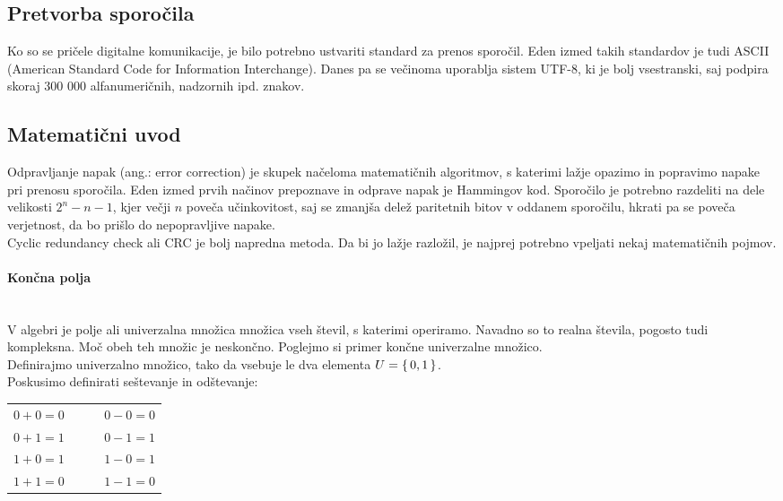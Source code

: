 \documentclass[12pt]{article}
\begin{document}
    \subsection{Pretvorba sporočila}
        Ko so se pričele digitalne komunikacije, je bilo potrebno ustvariti
        standard za prenos sporočil. Eden izmed takih standardov je tudi ASCII
        (American Standard Code for Information Interchange). Danes pa se
        večinoma uporablja sistem UTF-8, ki je bolj vsestranski, saj podpira
        skoraj 300 000 alfanumeričnih, nadzornih ipd. znakov.
    \subsection{Matematični uvod}
        Odpravljanje napak (ang.: error correction) je skupek načeloma
        matematičnih algoritmov, s katerimi lažje opazimo in popravimo napake
        pri prenosu sporočila.
        Eden izmed prvih načinov prepoznave in odprave napak je Hammingov kod.
        Sporočilo je potrebno razdeliti na dele velikosti $2^n - n - 1$,
        kjer večji $n$ poveča učinkovitost, saj se zmanjša delež paritetnih
        bitov v oddanem sporočilu, hkrati pa se poveča verjetnost, da bo prišlo
        do nepopravljive napake. \\

        Cyclic redundancy check ali CRC je bolj napredna metoda. Da bi jo lažje
        razložil, je najprej potrebno vpeljati nekaj matematičnih pojmov.
        \paragraph*{Končna polja} \label{sec:polja} \mbox{}\\
            V algebri je polje ali univerzalna množica množica vseh števil, s
            katerimi operiramo. Navadno so to realna števila, pogosto tudi
            kompleksna. Moč obeh teh množic je neskončno. Poglejmo si primer
            končne univerzalne množico. \\
            Definirajmo univerzalno množico, tako da vsebuje le dva elementa
            $U = \set{0, 1}$.\\
            Poskusimo definirati seštevanje in odštevanje:
            \begin{table}[h!]
                \centering
                \begin{tabular}{l p{0.2\linewidth}}
                    $0 + 0 = 0$  & $0 - 0 = 0$ \\
                    $0 + 1 = 1$  & $0 - 1 = 1$ \\
                    $1 + 0 = 1$  & $1 - 0 = 1$ \\
                    $1 + 1 = 0$  & $1 - 1 = 0$ \\
                \end{tabular}
            \end{table}
\end{document}

